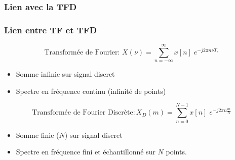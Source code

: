 \documentclass{beamer}
\begin{document}
\subsubsection{Lien avec la TFD}
\begin{frame} 
\frametitle{Lien entre TF et TFD}

\[\text{Transformée de Fourier: }X(\nu) = \sum_{n = -\infty}^{\infty} x[n] \; e^{-j 2 \pi n \nu T_e}\] 
\vspace{0.2cm}
\begin{itemize}
\item<2-> Somme infinie sur signal discret
\vspace{0.2cm}
\item<3-> Spectre en fréquence continu (infinité de points)
\end{itemize}
\vspace{1cm}
\[\text{Transformée de Fourier Discrète} :X_D(m) = \sum_{n = 0}^{N-1} x[n] \; e^{-j 2 \pi n \frac{m}{N} }\]
\vspace{0.2cm}
\begin{itemize}
\item<2-> Somme finie ($N$) sur signal discret 
\vspace{0.2cm}
\item<3-> Spectre en fréquence fini et échantillonné sur $N$ points.
\end{itemize}

\end{frame}
\end{document}
